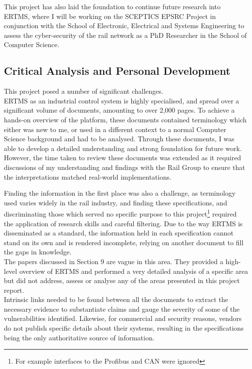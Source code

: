 \documentclass[twoside,11pt,a4paper]{article}
\begin{document}
This project has also laid the foundation to continue future research into ERTMS, where I will be working on the SCEPTICS EPSRC Project in conjunction with the School of Electronic, Electrical and Systems Engineering to assess the cyber-security of the rail network as a PhD Researcher in the School of Computer Science.

\subsection{Critical Analysis and Personal Development}
This project posed a number of significant challenges.\\ERTMS as an industrial control system is highly specialised, and spread over a significant volume of documents, amounting to over 2,000 pages. To achieve a hands-on overview of the platform, these documents contained terminology which either was new to me, or used in a different context to a normal Computer Science background and had to be analysed. Through these documents, I was able to develop a detailed understanding and strong foundation for future work. However, the time taken to review these documents was extended as it required discussions of my understanding and findings with the Rail Group to ensure that the interpretations matched real-world implementations.

Finding the information in the first place was also a challenge, as terminology used varies widely in the rail industry, and finding these specifications, and discriminating those which served no specific purpose to this project\footnote{For example interfaces to the Profibus and CAN were ignored} required the application of research skills and careful filtering. Due to the way ERTMS is disseminated as a standard, the information held in each specification cannot stand on its own and is rendered incomplete, relying on another document to fill the gaps in knowledge.\\The papers discussed in Section 9 are vague in this area. They provided a high-level overview of ERTMS and performed a very detailed analysis of a specific area but did not address, assess or analyse any of the areas presented in this project report.\\Intrinsic links needed to be found between all the documents to extract the necessary evidence to substantiate claims and gauge the severity of some of the vulnerabilities identified. Likewise, for commercial and security reasons, vendors do not publish specific details about their systems, resulting in the specifications being the only authoritative source of information.
\end{document}
